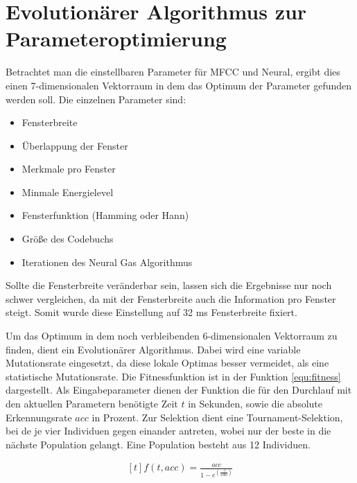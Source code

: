\section{Evolutionärer Algorithmus zur Parameteroptimierung}
Betrachtet man die einstellbaren Parameter für MFCC und Neural, ergibt dies einen 7-dimensionalen Vektorraum in dem das Optimum der Parameter gefunden werden soll. Die einzelnen Parameter sind:
\begin{itemize}
	\item Fensterbreite
	\item Überlappung der Fenster
	\item Merkmale pro Fenster
	\item Minmale Energielevel
	\item Fensterfunktion (Hamming oder Hann)
	\item Größe des Codebuchs
	\item Iterationen des Neural Gas Algorithmus
\end{itemize}
Sollte die Fensterbreite veränderbar sein, lassen sich die Ergebnisse nur noch schwer vergleichen, da mit der Fensterbreite auch die Information pro Fenster steigt. Somit wurde diese Einstellung auf 32 ms Fensterbreite fixiert.

Um das Optimum in dem noch verbleibenden 6-dimensionalen Vektorraum zu finden, dient ein Evolutionärer Algorithmus. Dabei wird eine variable Mutationsrate eingesetzt, da diese lokale Optimas besser vermeidet, als eine statistische Mutationsrate. Die Fitnessfunktion ist in der Funktion \ref{equ:fitness} dargestellt. Als Eingabeparameter dienen der Funktion die für den Durchlauf mit den aktuellen Parametern benötigte Zeit $t$ in Sekunden, sowie die absolute Erkennungsrate $acc$ in Prozent. Zur Selektion dient eine Tournament-Selektion, bei de je vier Individuen gegen einander antreten, wobei nur der beste in die nächste Population gelangt. Eine Population besteht aus 12 Individuen. 

\begin{equation}
	\label{equ:fitness}
	\begin{aligned}[t]f(t,acc) = \frac{acc}{1 - e^{\left(\frac{-t}{1000}\right)}}\end{aligned}
\end{equation}
